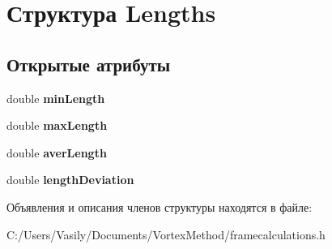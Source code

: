 \hypertarget{struct_lengths}{}\section{Структура Lengths}
\label{struct_lengths}
\subsection*{Открытые атрибуты}
\begin{DoxyCompactItemize}
\item 
\mbox{\label{struct_lengths_a4c7720de64d12afc881c072aa007c22b}} 
double {\bfseries min\+Length}
\item 
\mbox{\label{struct_lengths_a4bfef9aaf0d7ff95a3fa1e4ea1960b72}} 
double {\bfseries max\+Length}
\item 
\mbox{\label{struct_lengths_aaed1c0ac997920c90b45f2ed0d82ea36}} 
double {\bfseries aver\+Length}
\item 
\mbox{\label{struct_lengths_a9360138d80cf291bd8d3c052d4292eea}} 
double {\bfseries length\+Deviation}
\end{DoxyCompactItemize}


Объявления и описания членов структуры находятся в файле\+:\begin{DoxyCompactItemize}
\item 
C\+:/\+Users/\+Vasily/\+Documents/\+Vortex\+Method/framecalculations.\+h\end{DoxyCompactItemize}

